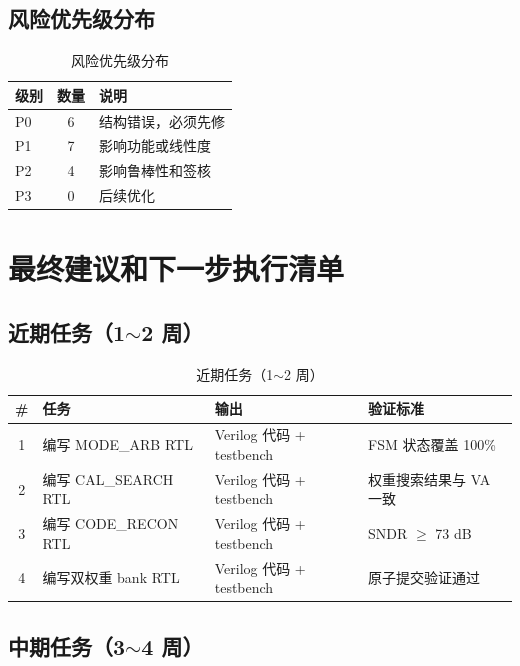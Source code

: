 \documentclass[UTF8,a4paper,11pt]{ctexart}
\begin{document}
\subsection{风险优先级分布}

\begin{table}[H]
\centering
\caption{风险优先级分布}
\label{tab:risk-priority}
\begin{tabular}{lcl}
\toprule
级别 & 数量 & 说明 \\
\midrule
P0 & 6  & 结构错误，必须先修 \\
P1 & 7  & 影响功能或线性度 \\
P2 & 4  & 影响鲁棒性和签核 \\
P3 & 0  & 后续优化 \\
\bottomrule
\end{tabular}
\end{table}

\section{最终建议和下一步执行清单}

\subsection{近期任务（1$\sim$2 周）}

\begin{table}[H]
\centering
\caption{近期任务（1$\sim$2 周）}
\label{tab:near-tasks}
\begin{tabular}{clll}
\toprule
\# & 任务 & 输出 & 验证标准 \\
\midrule
1 & 编写 MODE\_ARB RTL      & Verilog 代码 + testbench & FSM 状态覆盖 100\% \\
2 & 编写 CAL\_SEARCH RTL    & Verilog 代码 + testbench & 权重搜索结果与 VA 一致 \\
3 & 编写 CODE\_RECON RTL    & Verilog 代码 + testbench & SNDR $\geq$ 73 dB \\
4 & 编写双权重 bank RTL     & Verilog 代码 + testbench & 原子提交验证通过 \\
\bottomrule
\end{tabular}
\end{table}

\subsection{中期任务（3$\sim$4 周）}
\end{document}
